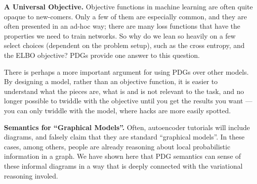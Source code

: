 \documentclass{article}
\theoremstyle{plain}
\theoremstyle{definition}
\begin{document}
\textbf{A Universal Objective.}
Objective functions in machine learning are often quite opaque to new-comers.
Only a few of them are especially common, and they are often presented in an ad-hoc way; there are many loss functions that have the properties we need to train networks. So why do we lean so heavily on a few select choices (dependent on the problem setup), such as the cross entropy, and the ELBO objective?
PDGs provide one answer to this question.

There is perhaps a more important argument for using PDGs over other models. By designing a model, rather than an objective function, it is easier to understand what the pieces are, what is and is not relevant to the task, and no longer possible to twiddle with the objective until you get the results you want --- you can only twiddle with the model, where hacks are more easily spotted.

\textbf{Semantics for ``Graphical Models''.}
Often, autoencoder tutorials will include diagrams, and falsely claim that they are standard ``graphical models''. In these cases, among others, people are already reasoning about local probabilistic information in a graph. We have shown here that PDG semantics can sense of these informal diagrams in a way that is deeply connected with the variational reasoning involed.



\end{document}
